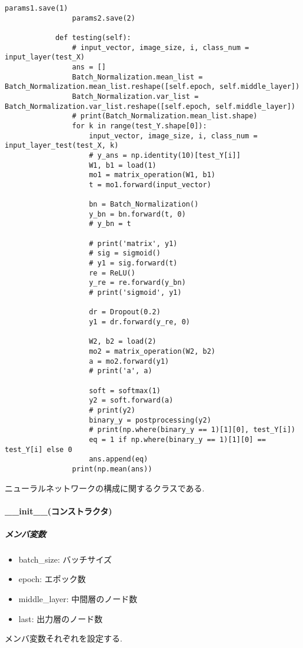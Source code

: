 \documentclass[a4j, titlepage]{jarticle}
\begin{document}
\begin{itemize}
\begin{lstlisting}[caption=3層ニューラルネットワークの構成 ,label=fuga]
                params1.save(1)
                params2.save(2)

            def testing(self):
                # input_vector, image_size, i, class_num = input_layer(test_X)
                ans = []
                Batch_Normalization.mean_list = Batch_Normalization.mean_list.reshape([self.epoch, self.middle_layer])
                Batch_Normalization.var_list = Batch_Normalization.var_list.reshape([self.epoch, self.middle_layer])
                # print(Batch_Normalization.mean_list.shape)
                for k in range(test_Y.shape[0]):
                    input_vector, image_size, i, class_num = input_layer_test(test_X, k)
                    # y_ans = np.identity(10)[test_Y[i]]
                    W1, b1 = load(1)
                    mo1 = matrix_operation(W1, b1)
                    t = mo1.forward(input_vector)

                    bn = Batch_Normalization()
                    y_bn = bn.forward(t, 0)
                    # y_bn = t

                    # print('matrix', y1)
                    # sig = sigmoid()
                    # y1 = sig.forward(t)
                    re = ReLU()
                    y_re = re.forward(y_bn)
                    # print('sigmoid', y1)

                    dr = Dropout(0.2)
                    y1 = dr.forward(y_re, 0)

                    W2, b2 = load(2)
                    mo2 = matrix_operation(W2, b2)
                    a = mo2.forward(y1)
                    # print('a', a)

                    soft = softmax(1)
                    y2 = soft.forward(a)
                    # print(y2)
                    binary_y = postprocessing(y2)
                    # print(np.where(binary_y == 1)[1][0], test_Y[i])
                    eq = 1 if np.where(binary_y == 1)[1][0] == test_Y[i] else 0
                    ans.append(eq)
                print(np.mean(ans))
        \end{lstlisting}
        ニューラルネットワークの構成に関するクラスである.
        \paragraph*{\_\_init\_\_(コンストラクタ)}
            \subparagraph*{メンバ変数}
            \begin{itemize}
                \item batch\_size: バッチサイズ
                \item epoch: エポック数
                \item middle\_layer: 中間層のノード数
                \item last: 出力層のノード数
            \end{itemize}
            メンバ変数それぞれを設定する.

\end{itemize}
\end{document}
